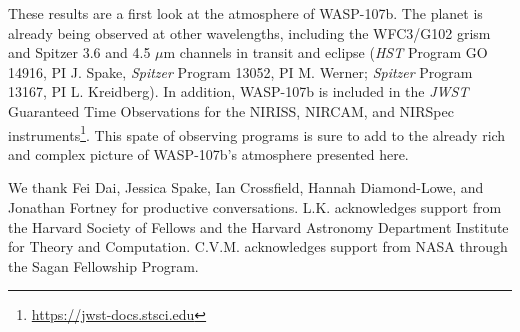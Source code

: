 \documentclass[twocolumn, trackchanges]{aastex61}
\begin{document}
These results are a first look at the atmosphere of WASP-107b. The planet is already being observed at other wavelengths, including the WFC3/G102 grism and Spitzer 3.6 and 4.5 $\mu$m channels in transit and eclipse (\emph{HST} Program GO 14916, PI J. Spake, \emph{Spitzer} Program 13052, PI M. Werner; \emph{Spitzer} Program 13167, PI L. Kreidberg).  In addition, WASP-107b is included in the \emph{JWST} Guaranteed Time Observations for the NIRISS, NIRCAM, and NIRSpec instruments\footnote{\url{https://jwst-docs.stsci.edu}}.  This spate of observing programs is sure to add to the already rich and complex picture of WASP-107b's atmosphere presented here. 


\acknowledgments
We thank Fei Dai, Jessica Spake, Ian Crossfield, Hannah Diamond-Lowe, and Jonathan Fortney for productive conversations. L.K. acknowledges support from the Harvard Society of Fellows and the Harvard Astronomy Department Institute for Theory and Computation. C.V.M. acknowledges support from NASA through the Sagan Fellowship Program.
\end{document}
